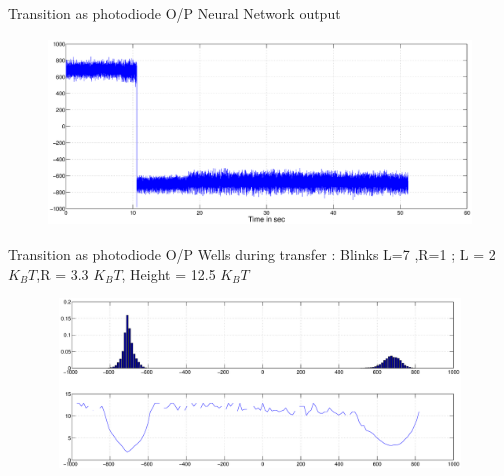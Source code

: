 \documentclass{beamer}
\begin{document}
\begin{frame}{Transition as photodiode O/P} 
Neural Network output
\begin{figure}
    \centering
    \includegraphics[height=5cm,width=12cm]{I4k_transfer_ActualPos_6.eps}
    \label{fig:graph24}
\end{figure}

\end{frame}

\begin{frame}{Transition as photodiode O/P} 
Wells during transfer : Blinks L=7 ,R=1 ; L = 2 $K_BT$,R = 3.3 $K_BT$, Height = 12.5 $K_BT$\\
\begin{figure}
    \centering
    \includegraphics[height=4.5cm,width=12cm]{I4k_transfer_wells_6.eps}
    \label{fig:graph25}
\end{figure}

\end{frame}

\end{document}

